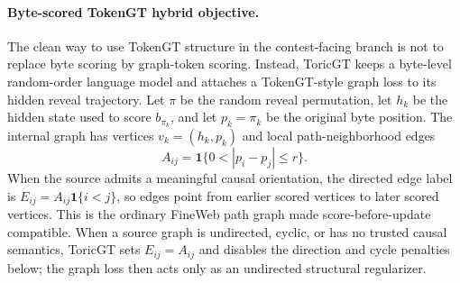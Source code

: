 \documentclass[11pt]{article}
\theoremstyle{definition}
\theoremstyle{plain}
\theoremstyle{remark}
\numberwithin{equation}{section}
\begin{document}
\paragraph{Byte-scored TokenGT hybrid objective.}
The clean way to use TokenGT structure in the contest-facing branch is not to
replace byte scoring by graph-token scoring.  Instead, ToricGT keeps a
byte-level random-order language model and attaches a TokenGT-style graph loss
to its hidden reveal trajectory.  Let $\pi$ be the random reveal permutation,
let $h_k$ be the hidden state used to score $b_{\pi_k}$, and let
$p_k=\pi_k$ be the original byte position.  The internal graph has vertices
$v_k=(h_k,p_k)$ and local path-neighborhood edges
\begin{equation}
  A_{ij}=\mathbf 1\{0<|p_i-p_j|\le r\}.
\end{equation}
When the source admits a meaningful causal orientation, the directed edge label
is $E_{ij}=A_{ij}\mathbf 1\{i<j\}$, so edges point from earlier scored vertices
to later scored vertices.  This is the ordinary FineWeb path graph made
score-before-update compatible.  When a source graph is undirected, cyclic, or
has no trusted causal semantics, ToricGT sets $E_{ij}=A_{ij}$ and disables the
direction and cycle penalties below; the graph loss then acts only as an
undirected structural regularizer.
\end{document}
